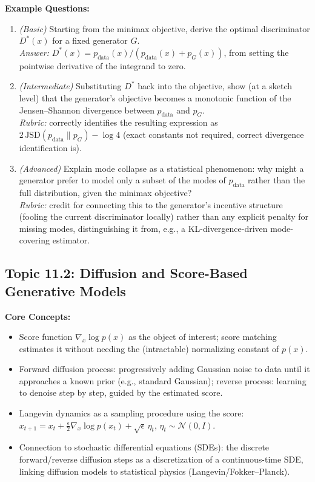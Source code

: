 \documentclass[11pt]{article}
\begin{document}
\textbf{Example Questions:}
\begin{enumerate}
  \item \textit{(Basic)} Starting from the minimax objective, derive the optimal discriminator $D^*(x)$ for a fixed generator $G$. \\
  \textit{Answer:} $D^*(x) = p_{\text{data}}(x)/(p_{\text{data}}(x) + p_G(x))$, from setting the pointwise derivative of the integrand to zero.
  \item \textit{(Intermediate)} Substituting $D^*$ back into the objective, show (at a sketch level) that the generator's objective becomes a monotonic function of the Jensen--Shannon divergence between $p_{\text{data}}$ and $p_G$. \\
  \textit{Rubric:} correctly identifies the resulting expression as $2\,\text{JSD}(p_{\text{data}}\|p_G) - \log 4$ (exact constants not required, correct divergence identification is).
  \item \textit{(Advanced)} Explain mode collapse as a statistical phenomenon: why might a generator prefer to model only a subset of the modes of $p_{\text{data}}$ rather than the full distribution, given the minimax objective? \\
  \textit{Rubric:} credit for connecting this to the generator's incentive structure (fooling the current discriminator locally) rather than any explicit penalty for missing modes, distinguishing it from, e.g., a KL-divergence-driven mode-covering estimator.
\end{enumerate}

\subsection{Topic 11.2: Diffusion and Score-Based Generative Models}

\textbf{Core Concepts:}
\begin{itemize}
  \item Score function $\nabla_x \log p(x)$ as the object of interest; score matching estimates it without needing the (intractable) normalizing constant of $p(x)$.
  \item Forward diffusion process: progressively adding Gaussian noise to data until it approaches a known prior (e.g., standard Gaussian); reverse process: learning to denoise step by step, guided by the estimated score.
  \item Langevin dynamics as a sampling procedure using the score: $x_{t+1} = x_t + \tfrac{\epsilon}{2}\nabla_x \log p(x_t) + \sqrt{\epsilon}\,\eta_t$, $\eta_t \sim \mathcal N(0,I)$.
  \item Connection to stochastic differential equations (SDEs): the discrete forward/reverse diffusion steps as a discretization of a continuous-time SDE, linking diffusion models to statistical physics (Langevin/Fokker--Planck).
\end{itemize}
\end{document}
